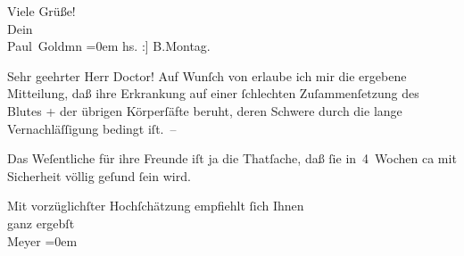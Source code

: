 \pstart
           Viele Grüße! {\\[\baselineskip]}Dein {\\[\baselineskip]}\spacefill\mbox{Paul Goldmn}\pend
           \leftskip=0em{}\vspace{1em}{\vspace{1\baselineskip}}
\pstart
           \raggedleft{}{\pb}{[}hs. :{]} B.Montag.\pend
           
\pstart\center{}Sehr geehrter Herr Doctor!\pend\vspace{0.5em}
\pstart
           Auf Wunſch von \label{K_L03058-2v}\label{K_L03058-2} erlaube ich mir die ergebene Mitteilung, daß ihre Erkrankung auf einer
               ſchlechten Zuſammenſetzung des Blutes + der übrigen Körperſäfte beruht, deren Schwere
               durch die lange Vernachläſſigung bedingt iſt. –\pend
           
\pstart
           Das Weſentliche für {\pb}ihre Freunde iſt ja die
               Thatſache, daß ſie in 4 Wochen ca mit Sicherheit völlig geſund ſein wird.\pend
           
\pstart
           Mit vorzüglichſter Hochſchätzung empfiehlt ſich Ihnen {\\[\baselineskip]}ganz ergebſt { }{\\[\baselineskip]}\spacefill\mbox{Meyer}\pend
           \leftskip=0em{}\endnumbering{}  
      